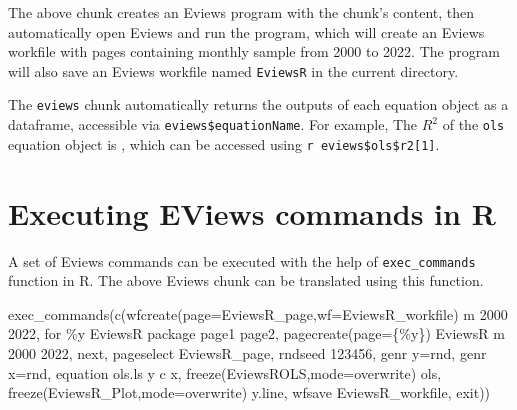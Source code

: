 \documentclass[
]{article}
\newenvironment{Shaded}{\begin{snugshade}}{\end{snugshade}}
\newcommand{\FunctionTok}[1]{\textcolor[rgb]{0.00,0.00,0.00}{#1}}
\newcommand{\NormalTok}[1]{#1}
\newcommand{\StringTok}[1]{\textcolor[rgb]{0.31,0.60,0.02}{#1}}
\begin{document}
The above chunk creates an Eviews program with the chunk's content, then automatically open Eviews and run the program, which will create an Eviews workfile with pages containing monthly sample from 2000 to 2022. The program will also save an Eviews workfile named \texttt{EviewsR} in the current directory.

The \texttt{eviews} chunk automatically returns the outputs of each equation object as a dataframe, accessible via \texttt{eviews\$equationName}. For example, The \(R^2\) of the \texttt{ols} equation object is , which can be accessed using \texttt{\textasciigrave{}r\ eviews\$ols\$r2{[}1{]}\textasciigrave{}}.

\hypertarget{executing-eviews-commands-in-r}{%
\section{Executing EViews commands in R}\label{executing-eviews-commands-in-r}}

A set of Eviews commands can be executed with the help of \texttt{exec\_commands} function in R. The above Eviews chunk can be translated using this function.

\begin{Shaded}
\begin{Highlighting}[]
\FunctionTok{exec\_commands}\NormalTok{(}\FunctionTok{c}\NormalTok{(}\StringTok{\textquotesingle{}wfcreate(page=EviewsR\_page,wf=EviewsR\_workfile) m 2000 2022\textquotesingle{}}\NormalTok{,}
  \StringTok{\textquotesingle{}for \%y EviewsR package page1 page2\textquotesingle{}}\NormalTok{,}
  \StringTok{\textquotesingle{}pagecreate(page=\{\%y\}) EviewsR m 2000 2022\textquotesingle{}}\NormalTok{,}
  \StringTok{\textquotesingle{}next\textquotesingle{}}\NormalTok{,}
\StringTok{\textquotesingle{}  pageselect EviewsR\_page\textquotesingle{}}\NormalTok{,}
  \StringTok{\textquotesingle{}rndseed 123456\textquotesingle{}}\NormalTok{,}
\StringTok{\textquotesingle{}  genr y=rnd\textquotesingle{}}\NormalTok{,}
  \StringTok{\textquotesingle{}genr x=rnd\textquotesingle{}}\NormalTok{,}
  \StringTok{\textquotesingle{}equation ols.ls y c x\textquotesingle{}}\NormalTok{,}
  \StringTok{\textquotesingle{}freeze(EviewsROLS,mode=overwrite) ols\textquotesingle{}}\NormalTok{,}
  \StringTok{\textquotesingle{}freeze(EviewsR\_Plot,mode=overwrite) y.line\textquotesingle{}}\NormalTok{,}
  \StringTok{\textquotesingle{}wfsave EviewsR\_workfile\textquotesingle{}}\NormalTok{,}
  \StringTok{\textquotesingle{}exit\textquotesingle{}}\NormalTok{))}
\end{Highlighting}
\end{Shaded}
\end{document}
